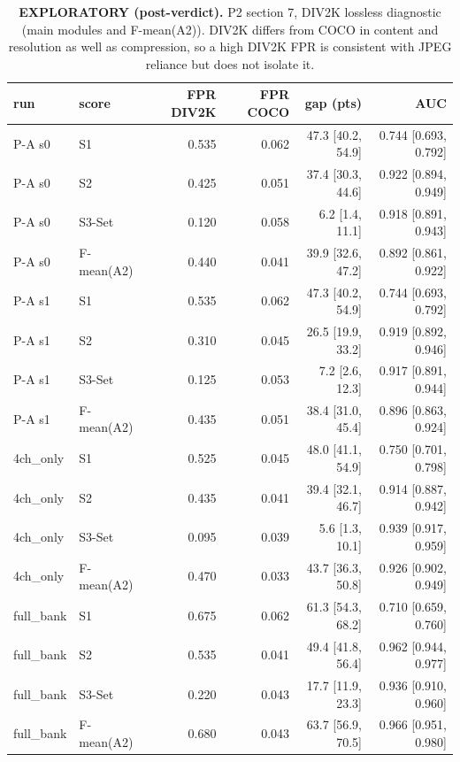 \begin{table}[htbp]
\centering
\scriptsize
\caption{\textbf{EXPLORATORY (post-verdict).} P2 section 7, DIV2K lossless diagnostic (main modules and F-mean(A2)). DIV2K differs from COCO in content and resolution as well as compression, so a high DIV2K FPR is consistent with JPEG reliance but does not isolate it.}
\label{tab:div2k-diagnostic-main}
\begin{tabular}{llrrrr}
\toprule
run & score & FPR DIV2K & FPR COCO & gap (pts) & AUC \\
\midrule
P-A s0 & S1 & 0.535 & 0.062 & 47.3 [40.2, 54.9] & 0.744 [0.693, 0.792] \\
P-A s0 & S2 & 0.425 & 0.051 & 37.4 [30.3, 44.6] & 0.922 [0.894, 0.949] \\
P-A s0 & S3-Set & 0.120 & 0.058 & 6.2 [1.4, 11.1] & 0.918 [0.891, 0.943] \\
P-A s0 & F-mean(A2) & 0.440 & 0.041 & 39.9 [32.6, 47.2] & 0.892 [0.861, 0.922] \\
P-A s1 & S1 & 0.535 & 0.062 & 47.3 [40.2, 54.9] & 0.744 [0.693, 0.792] \\
P-A s1 & S2 & 0.310 & 0.045 & 26.5 [19.9, 33.2] & 0.919 [0.892, 0.946] \\
P-A s1 & S3-Set & 0.125 & 0.053 & 7.2 [2.6, 12.3] & 0.917 [0.891, 0.944] \\
P-A s1 & F-mean(A2) & 0.435 & 0.051 & 38.4 [31.0, 45.4] & 0.896 [0.863, 0.924] \\
4ch\_only & S1 & 0.525 & 0.045 & 48.0 [41.1, 54.9] & 0.750 [0.701, 0.798] \\
4ch\_only & S2 & 0.435 & 0.041 & 39.4 [32.1, 46.7] & 0.914 [0.887, 0.942] \\
4ch\_only & S3-Set & 0.095 & 0.039 & 5.6 [1.3, 10.1] & 0.939 [0.917, 0.959] \\
4ch\_only & F-mean(A2) & 0.470 & 0.033 & 43.7 [36.3, 50.8] & 0.926 [0.902, 0.949] \\
full\_bank & S1 & 0.675 & 0.062 & 61.3 [54.3, 68.2] & 0.710 [0.659, 0.760] \\
full\_bank & S2 & 0.535 & 0.041 & 49.4 [41.8, 56.4] & 0.962 [0.944, 0.977] \\
full\_bank & S3-Set & 0.220 & 0.043 & 17.7 [11.9, 23.3] & 0.936 [0.910, 0.960] \\
full\_bank & F-mean(A2) & 0.680 & 0.043 & 63.7 [56.9, 70.5] & 0.966 [0.951, 0.980] \\
\bottomrule
\end{tabular}
\end{table}
